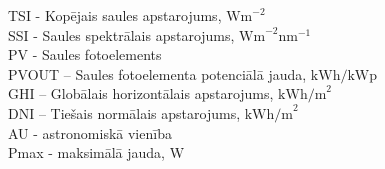\noindent TSI - Kopējais saules apstarojums, $\textrm{Wm}^{-2}$\\
SSI - Saules spektrālais apstarojums, $\textrm{Wm}^{-2}\textrm{nm}^{-1}$\\
PV - Saules fotoelements\\ %
PVOUT – Saules fotoelementa potenciālā jauda, $\textrm{kWh/kWp}$\\ %
GHI – Globālais horizontālais apstarojums,  $\textrm{kWh/m}^2$\\ %
DNI – Tiešais normālais apstarojums, $\textrm{kWh/m}^2$\\ %
AU - astronomiskā vienība\\  %
Pmax - maksimālā jauda, W

